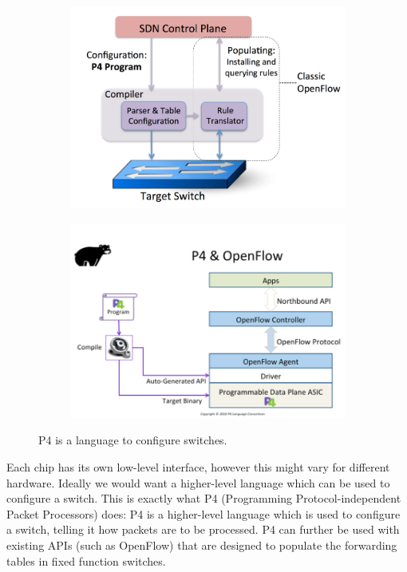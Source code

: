 \documentclass[11pt,oneside,a4paper]{article}
\begin{document}
\begin{figure}%
	\centering
	\begin{subfigure}[t]{.5\textwidth}
		\centering
		\includegraphics[width=\linewidth]{figures/P4_overview}
		\label{fig:P4_overview}
	\end{subfigure}%
	\begin{subfigure}[t]{.5\textwidth}
		\centering
		\includegraphics[width=\linewidth]{figures/P4_openflow}
		\label{fig:P4_openflow}
	\end{subfigure}
	\caption{P4 is a language to configure switches. \cite{bosshart2014p4}}
\end{figure}


Each chip has its own low-level interface, however this might vary for different hardware. Ideally we would want a higher-level language which can be used to configure a switch. This is exactly what P4 (Programming Protocol-independent Packet Processors) does: P4 is a higher-level language which is used to configure a switch, telling it how packets are to be processed. P4 can further be used with existing APIs (such as OpenFlow) that are designed to populate the forwarding tables in fixed function switches.
\end{document}
